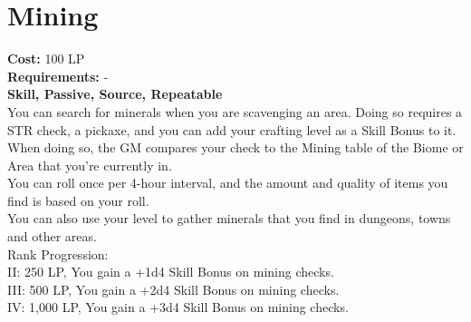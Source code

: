 \section{Mining}\label{perk:mining}
\textbf{Cost:} 100 LP\\
\textbf{Requirements:} -\\
\textbf{Skill, Passive, Source, Repeatable}\\
You can search for minerals when you are scavenging an area.
Doing so requires a STR check, a pickaxe, and you can add your crafting level as a Skill Bonus to it.
When doing so, the GM compares your check to the Mining table of the Biome or Area that you're currently in.\\
You can roll once per 4-hour interval, and the amount and quality of items you find is based on your roll.\\
You can also use your level to gather minerals that you find in dungeons, towns and other areas.
\\
Rank Progression:\\
II: 250 LP, You gain a +1d4 Skill Bonus on mining checks.\\
III: 500 LP, You gain a +2d4 Skill Bonus on mining checks.\\
IV: 1,000 LP, You gain a +3d4 Skill Bonus on mining checks.\\